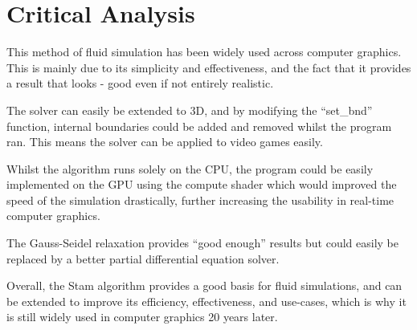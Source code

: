 \documentclass[notitlepage,12pt]{article}
\begin{document}
\section{Critical Analysis}

This method of fluid simulation has been widely used across computer graphics. This is mainly due to its simplicity and effectiveness, and the fact that it provides a result that looks - good even if not entirely realistic.

The solver can easily be extended to 3D, and by modifying the ``set\_bnd'' function, internal boundaries could be added and removed whilst the program ran. This means the solver can be applied to video games easily.

Whilst the algorithm runs solely on the CPU, the program could be easily implemented on the GPU using the compute shader which would improved the speed of the simulation drastically, further increasing the usability in real-time computer graphics.

The Gauss-Seidel relaxation provides ``good enough'' results but could easily be replaced by a better partial differential equation solver.

Overall, the Stam algorithm provides a good basis for fluid simulations, and can be extended to improve its efficiency, effectiveness, and use-cases, which is why it is still widely used in computer graphics 20 years later.

\clearpage


\end{document}
